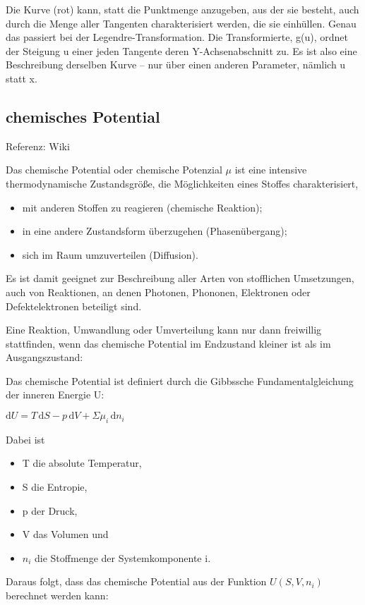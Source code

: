 \documentclass[]{article}
\begin{document}
 Die Kurve (rot) kann, statt die Punktmenge anzugeben, aus der sie besteht, auch durch die Menge aller Tangenten charakterisiert werden, die sie einhüllen. Genau das passiert bei der Legendre-Transformation. Die Transformierte, g(u), ordnet der Steigung u einer jeden Tangente deren Y-Achsenabschnitt zu. Es ist also eine Beschreibung derselben Kurve – nur über einen anderen Parameter, nämlich u statt x.


\subsection{chemisches Potential}
Referenz: Wiki

Das chemische Potential oder chemische Potenzial $\mu$ ist eine intensive thermodynamische Zustandsgröße, die Möglichkeiten eines Stoffes charakterisiert,
\begin{itemize}
 \item mit anderen Stoffen zu reagieren (chemische Reaktion);
 \item in eine andere Zustandsform überzugehen (Phasenübergang);
 \item sich im Raum umzuverteilen (Diffusion).
\end{itemize}

Es ist damit geeignet zur Beschreibung aller Arten von stofflichen Umsetzungen, auch von Reaktionen, an denen Photonen, Phononen, Elektronen oder Defektelektronen beteiligt sind.

Eine Reaktion, Umwandlung oder Umverteilung kann nur dann freiwillig stattfinden, wenn das chemische Potential im Endzustand kleiner ist als im Ausgangszustand:

Das chemische Potential ist definiert durch die Gibbssche Fundamentalgleichung der inneren Energie U:

   $ \mathrm{d}U = T\, \mathrm{d}S - p\, \mathrm {d}V + \Sigma\mu_i\, \mathrm{d}n_i \!\quad$

Dabei ist
\begin{itemize}
   \item T die absolute Temperatur,
   \item S die Entropie,
   \item p der Druck,
   \item V das Volumen und
   \item $n_i$ die Stoffmenge der Systemkomponente i.
\end{itemize}
Daraus folgt, dass das chemische Potential aus der Funktion $U(S, V, n_i)$ berechnet werden kann:
\end{document}

